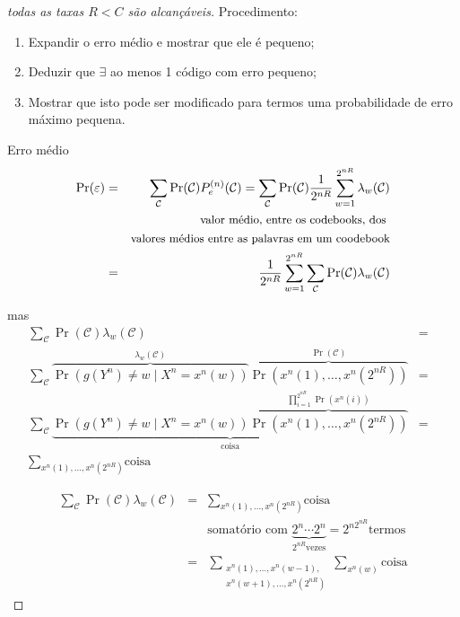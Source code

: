 \begin{frame}[allowframebreaks]
\begin{proof}[todas as taxas $R < C$ são alcançáveis]
  \proofbreak

  Procedimento:
  \begin{enumerate}
  \item Expandir o erro médio e mostrar que ele é pequeno;
  \item Deduzir que $\exists$ ao menos 1 código com erro pequeno;
  \item Mostrar que isto pode ser modificado para termos uma probabilidade de erro máximo pequena.
  \end{enumerate}

  \proofbreak
  Erro médio
  \begin{eqnarray}
  \Pr(\varepsilon) &=& \sum_{\mathcal{C}} \Pr(\mathcal{C}) P_e^{(n)}(\mathcal{C}) = \sum_{\mathcal{C}} \Pr(\mathcal{C}) \frac{1}{2^{nR}} \sum_{w=1}^{2^{nR}} \lambda_w(\mathcal{C}) \nonumber \\
	&& \text{\small valor médio, entre os codebooks, dos } \nonumber \\
	&& \text{\small valores médios entre as palavras em um coodebook} \nonumber \\
	&=& \frac{1}{2^{nR}} \sum_{w=1}^{2^{nR}} \sum_{\mathcal{C}} \Pr(\mathcal{C}) \lambda_w(\mathcal{C}) 
  \end{eqnarray}

  \proofbreak

  mas
  \vspace{-0.75cm}
  \begin{eqnarray}
  \sum_{\mathcal{C}} \Pr(\mathcal{C}) \lambda_w(\mathcal{C}) &=& \nonumber \\
  \sum_{\mathcal{C}} \overbrace{\Pr\left( g(Y^n) \neq w \mid X^n = x^n(w) \right)}^{\lambda_w(\mathcal{C})} \overbrace{\Pr\left( x^n(1), \ldots, x^n(2^{nR}) \right)}^{\Pr(\mathcal{C})} &=& \nonumber \\
  \sum_{\mathcal{C}} \underbrace{ \Pr\left( g(Y^n) \neq w \mid X^n = x^n(w) \right) \overbrace{\Pr\left( x^n(1), \ldots, x^n(2^{nR}) \right)}^{ \prod_{i=1}^{2^{nR}} \Pr(x^n(i)) }  }_{\text{coisa}} &=& \nonumber \\
  \sum_{ x^n(1), \ldots, x^n(2^{nR}) } \text{coisa} 
  \end{eqnarray}

  \proofbreak

  \vspace{-0.5cm}
  \begin{eqnarray}
  \sum_{\mathcal{C}} \Pr(\mathcal{C}) \lambda_w(\mathcal{C}) &=& \sum_{ x^n(1), \ldots, x^n(2^{nR}) } \text{coisa} \nonumber \\
	&& \text{somatório com } \underbrace{2^n \cdots 2^n}_{2^{nR} \text{vezes}} = 2^{n2^{nR}} \text{termos} \nonumber \\
  	&=& 
  \sum_{ \substack{ x^n(1), \ldots, x^n(w-1),  \\ x^n(w+1), \ldots, x^n(2^{nR}) } } \sum_{x^n (w)} \text{coisa} 
  \end{eqnarray}


\end{proof}
\end{frame}
